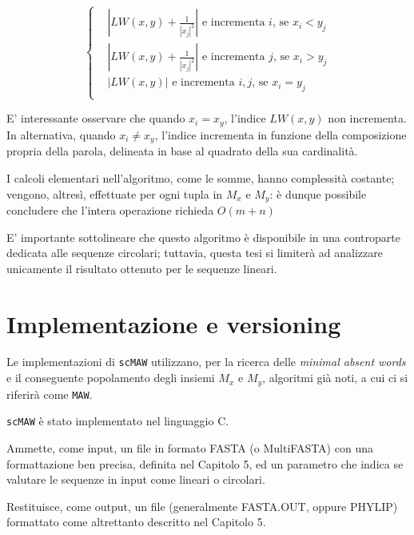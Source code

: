\begin{equation*}
  \left\{
    \begin{aligned}
      & {\left|
        LW(x,y) + \frac{1}{|x_j |^2}
      \right|} \text{ e incrementa } i\text{, se } x_i < y_j \\
      & {\left|
        LW(x,y) + \frac{1}{|x_j |^2}
      \right|} \text{ e incrementa } j\text{, se } x_i > y_j \\
      & {\left|
        LW(x,y)
      \right|} \text{ e incrementa } i,j\text{, se } x_i = y_j \\
    \end{aligned}
  \right.
\end{equation*}

E' interessante osservare che quando $x_i = x_y$, l'indice $LW(x,y)$ non incrementa. In alternativa, quando $x_i\not= x_y$, l'indice incrementa in funzione della composizione propria della parola, delineata in base al quadrato della sua cardinalità.

\vspace{3mm}

I calcoli elementari nell'algoritmo, come le somme, hanno complessità costante; vengono, altresì, effettuate per ogni tupla in $M_x$ e $M_y$: è dunque possibile concludere che l'intera operazione richieda $O(m+n)$

\vspace{3mm}

E' importante sottolineare che questo algoritmo è disponibile in una controparte dedicata alle sequenze circolari; tuttavia, questa tesi si limiterà ad analizzare unicamente il risultato ottenuto per le sequenze lineari.

\section{Implementazione e versioning}

Le implementazioni di \verb|scMAW| utilizzano, per la ricerca delle \textit{minimal absent words} e il conseguente popolamento degli insiemi $M_x$ e $M_y$, algoritmi già noti, a cui ci si riferirà come \verb|MAW|. 

\verb|scMAW| è stato implementato nel linguaggio C. 

Ammette, come input, un file in formato FASTA (o MultiFASTA) con una formattazione ben precisa, definita nel Capitolo 5, ed un parametro che indica se valutare le sequenze in input come lineari o circolari. 

Restituisce, come output, un file (generalmente FASTA.OUT, oppure PHYLIP) formattato come altrettanto descritto nel Capitolo 5. 

